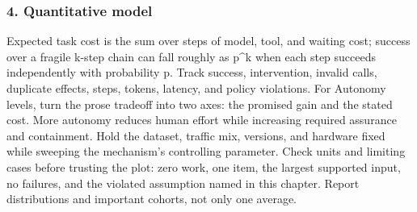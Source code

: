 \subsubsection*{4. Quantitative model}
Expected task cost is the sum over steps of model, tool, and waiting cost; success over a fragile k-step chain can fall roughly as p\textasciicircum{}k when each step succeeds independently with probability p. Track success, intervention, invalid calls, duplicate effects, steps, tokens, latency, and policy violations.
For Autonomy levels, turn the prose tradeoff into two axes: the promised gain and the stated cost. More autonomy reduces human effort while increasing required assurance and containment. Hold the dataset, traffic mix, versions, and hardware fixed while sweeping the mechanism's controlling parameter.
Check units and limiting cases before trusting the plot: zero work, one item, the largest supported input, no failures, and the violated assumption named in this chapter. Report distributions and important cohorts, not only one average.
